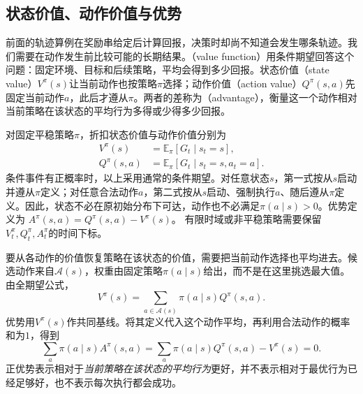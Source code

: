 \subsection{状态价值、动作价值与优势}
\label{sec:rl-overview-value-functions}

前面的轨迹算例在奖励串给定后计算回报，决策时却尚不知道会发生哪条轨迹。我们需要在动作发生前比较可能的长期结果。（value function）用条件期望回答这个问题：固定环境、目标和后续策略，平均会得到多少回报。状态价值（state value）$V^\pi(s)$让当前动作也按策略$\pi$选择；动作价值（action value）$Q^\pi(s,a)$先固定当前动作$a$，此后才遵从$\pi$。两者的差称为（advantage），衡量这一个动作相对当前策略在该状态的平均行为多得或少得多少回报。

\begin{definition}
  \label{def:rl-overview-values}
  对固定平稳策略$\pi$，折扣状态价值与动作价值分别为
  \begin{equation}
  \begin{aligned}
    V^\pi(s)&=\mathbb E_\pi[G_t\mid s_t=s],\\
    Q^\pi(s,a)&=\mathbb E_\pi[G_t\mid s_t=s,a_t=a].
  \end{aligned}
  \label{eq:rl-overview-values}
  \end{equation}
  条件事件有正概率时，以上采用通常的条件期望。对任意状态$s$，第一式按从$s$启动并遵从$\pi$定义；对任意合法动作$a$，第二式按从$s$启动、强制执行$a$、随后遵从$\pi$定义。因此，状态不必在原初始分布下可达，动作也不必满足$\pi(a\mid s)>0$。优势定义为
  $A^\pi(s,a)=Q^\pi(s,a)-V^\pi(s)$。
  有限时域或非平稳策略需要保留$V_t^\pi,Q_t^\pi,A_t^\pi$的时间下标。
\end{definition}

要从各动作的价值恢复策略在该状态的价值，需要把当前动作选择也平均进去。候选动作来自$\mathcal A(s)$，权重由固定策略$\pi(a\mid s)$给出，而不是在这里挑选最大值。由全期望公式，
\begin{equation}
  V^\pi(s)=\sum_{a\in\mathcal A(s)}\pi(a\mid s)Q^\pi(s,a).
  \label{eq:rl-overview-vq}
\end{equation}
优势用$V^\pi(s)$作共同基线。将其定义代入这个动作平均，再利用合法动作的概率和为$1$，得到
\[
  \sum_a\pi(a\mid s)A^\pi(s,a)
  =\sum_a\pi(a\mid s)Q^\pi(s,a)-V^\pi(s)=0.
\]
正优势表示相对于\emph{当前策略在该状态的平均行为}更好，并不表示相对于最优行为已经足够好，也不表示每次执行都会成功。

